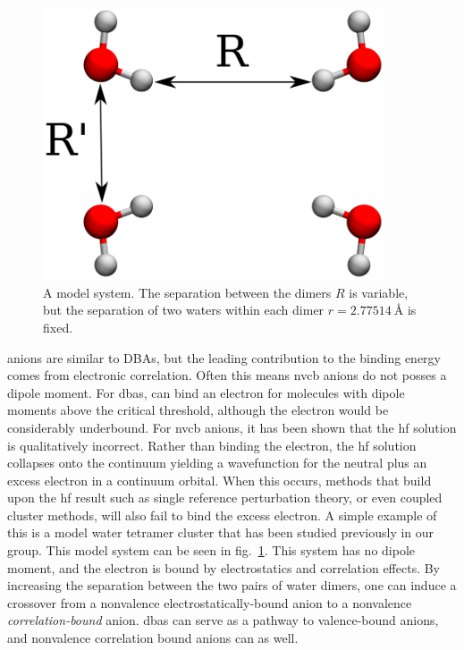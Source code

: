 \begin{figure}
    \centering
	\includegraphics[width=0.9\textwidth,keepaspectratio]{Images/chapter1/h2o4_labeled.eps}
	\caption{A model  system. The separation between the dimers $R$ is variable, but the separation of two waters within each dimer $r=\SI{2.77514}{\angstrom}$ is fixed.}
	\label{fig:h2o4}
\end{figure}
 anions are similar to DBAs, but the leading contribution to the binding energy comes from electronic correlation.
Often this means \gls{nvcb} anions do not posses a dipole moment.
For \glspl{dba},  can bind an electron for molecules with dipole moments above the critical threshold, although the electron would be considerably underbound.
For \gls{nvcb} anions, it has been shown that the \gls{hf} solution is qualitatively incorrect.
Rather than binding the electron, the \gls{hf} solution collapses onto the continuum yielding a wavefunction for the neutral plus an excess electron in a continuum orbital.
When this occurs, methods that build upon the \gls{hf} result such as single reference perturbation theory, or even coupled cluster methods, will also fail to bind the excess electron.
A simple example of this is a model water tetramer cluster that has been studied previously in our group.\cite{10.1063/1.4991497}
This model system can be seen in fig.~\ref{fig:h2o4}.
This system has no dipole moment, and the electron is bound by electrostatics and correlation effects.
By increasing the separation between the two pairs of water dimers, one can induce a crossover from a nonvalence electrostatically-bound anion to a nonvalence \textit{correlation-bound} anion.
\Glspl{dba} can serve as a pathway to valence-bound anions\cite{10.1063/1.475360,10.1063/1.472993,10.1063/1.471484,10.1021/jp9728417}, and nonvalence correlation bound anions can as well.\cite{10.1021/jp408386f}

